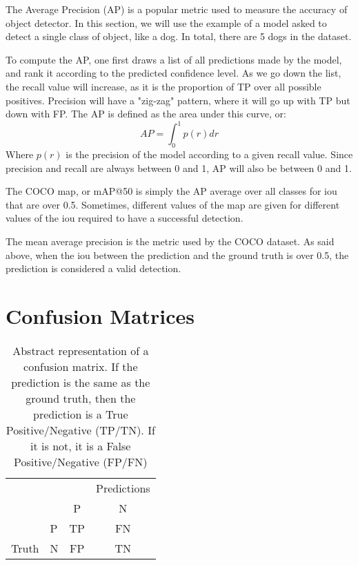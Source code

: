 The Average Precision (AP) is a popular metric used to measure the accuracy of object detector. In this section, we will use the example of a model asked to detect a single class of object, like a dog. In total, there are 5 dogs in the dataset. 

To compute the AP, one first draws a list of all predictions made by the model, and rank it according to the predicted confidence level. As we go down the list, the recall value will increase, as it is the proportion of TP over all possible positives. Precision will have a "zig-zag" pattern, where it will go up with TP but down with FP. The AP is defined as the area under this curve, or:
\begin{equation}
	AP = \int_0^1 p(r) dr
\end{equation}
Where $p(r)$ is the precision of the model according to a given recall value. Since precision and recall are always between 0 and 1, AP will also be between 0 and 1. 

The COCO \gls{map}, or mAP@50 is simply the AP average over all classes for \gls{iou} that are over 0.5. Sometimes, different values of the \gls{map} are given for different values of the \gls{iou} required to have a successful detection.

The mean average precision is the metric used by the COCO dataset\cite{msCOCO}. As said above, when the \gls{iou} between the prediction and the ground truth is over 0.5, the prediction is considered a valid detection. 


\section{Confusion Matrices}
\begin{table}[H]
	\centering
	\begin{tabular}{ll|cc}
		                           &   & \multicolumn{1}{l}{} & \multicolumn{1}{l}{Predictions} \\ \cline{3-4} 
					                              &   & P                    & N                               \\ \hline
								      \multicolumn{1}{l|}{}      & P & TP                   & FN                              \\
								      \multicolumn{1}{l|}{Truth} & N & FP                   & TN                             
	\end{tabular}
	\caption{Abstract representation of a confusion matrix. If the prediction is the same as the ground truth, then the prediction is a True Positive/Negative (TP/TN). If it is not, it is a False Positive/Negative (FP/FN) }
	\label{tab:confusionMatAbs}
\end{table}
	
